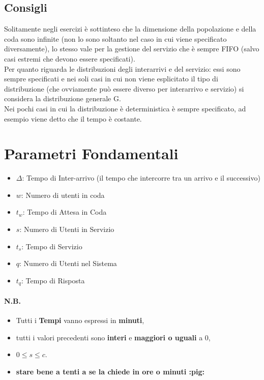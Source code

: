 \subsection*{Consigli}
Solitamente negli esercizi è sottinteso che la dimensione della popolazione e
della coda sono infinite (non lo sono soltanto nel caso in cui viene specificato
diversamente), lo stesso vale per la gestione del servizio che è sempre FIFO
(salvo casi estremi che devono essere specificati).\\
Per quanto riguarda le distribuzioni degli interarrivi e del servizio: essi sono
sempre specificati e nei soli casi in cui non viene esplicitato il tipo di
distribuzione (che ovviamente può essere diverso per interarrivo e servizio) si
considera la distribuzione generale G.\\
Nei pochi casi in cui la distribuzione è deterministica è sempre specificato, ad
esempio viene detto che il tempo è costante.

\section{Parametri Fondamentali}

\begin{itemize}
    \item $\Delta$: Tempo di Inter-arrivo (il tempo che intercorre tra un arrivo
          e il successivo)
    \item $w$: Numero di utenti in coda
    \item $t_w$: Tempo di Attesa in Coda
    \item $s$: Numero di Utenti in Servizio
    \item $t_s$: Tempo di Servizio
    \item $q$: Numero di Utenti nel Sistema
    \item $t_q$: Tempo di Risposta
\end{itemize}

\paragraph{N.B.}
\begin{itemize}
    \item Tutti i \textbf{Tempi} vanno espressi in \textbf{minuti},
    \item tutti i valori precedenti sono \textbf{interi} e \textbf{maggiori o
              uguali} a 0,
    \item $0 \leq s \leq c$.
    \item \textbf{stare bene a tenti a se la chiede in ore o minuti :pig:}
\end{itemize}

